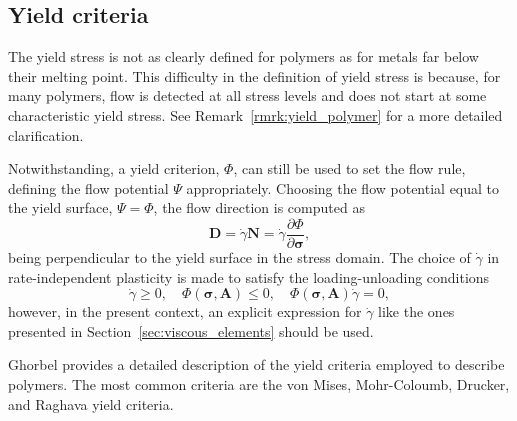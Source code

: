 
\subsection{Yield criteria}
\label{sec:yield_criteria}

The yield stress is not as clearly defined for polymers as for metals far below their melting point.
This difficulty in the definition of yield stress is because, for many polymers, flow is detected at all stress levels and does not start at some characteristic yield stress.
See Remark~\ref{rmrk:yield_polymer} for a more detailed clarification.

Notwithstanding, a yield criterion, $\Phi$, can still be used to set the flow rule, defining the flow potential $\Psi$ appropriately.
Choosing the flow potential equal to the yield surface, $\Psi = \Phi$, the flow direction is computed as
\begin{equation}
	\mathbf D = \dot \gamma \mathbf N = \dot \gamma \frac{\partial \Phi}{\partial \bm \sigma},
\end{equation}
being perpendicular to the yield surface in the stress domain.
The choice of $\dot \gamma$ in rate-independent plasticity is made to satisfy the loading-unloading conditions
\begin{equation}
	\dot\gamma \geq 0,\quad \Phi(\bm \sigma, \mathbf A) \leq 0,\quad \Phi(\bm \sigma, \mathbf A) \dot \gamma = 0,
\end{equation}
however, in the present context, an explicit expression for $\dot \gamma$ like the ones presented in Section~\ref{sec:viscous_elements} should be used.

Ghorbel \citep{ghorbelViscoplasticConstitutiveModel2008} provides a detailed description of the yield criteria employed to describe polymers.
The most common criteria are the von Mises, Mohr-Coloumb, Drucker, and Raghava yield \citep{balieuNonassociatedViscoplasticityCoupled2014} criteria.

%

